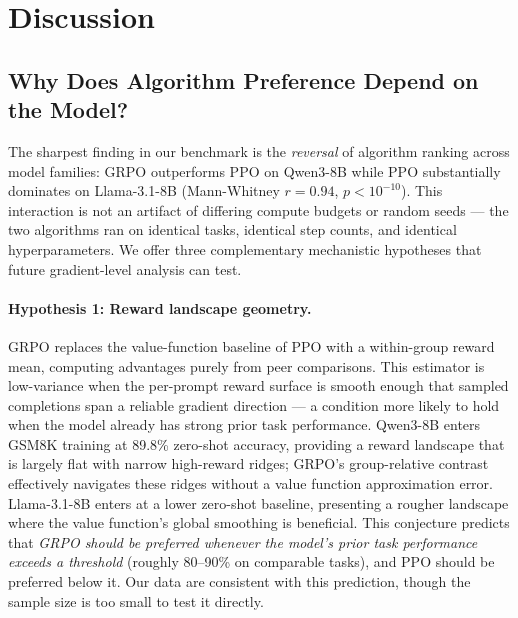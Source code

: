 \documentclass{article}
\begin{document}
\section{Discussion}
\label{sec:discussion}

\subsection{Why Does Algorithm Preference Depend on the Model?}
\label{sec:discuss_model_algo}

The sharpest finding in our benchmark is the \emph{reversal} of algorithm
ranking across model families: GRPO outperforms PPO on Qwen3-8B while PPO
substantially dominates on Llama-3.1-8B (Mann-Whitney $r = 0.94$,
$p < 10^{-10}$).
This interaction is not an artifact of differing compute budgets or random
seeds --- the two algorithms ran on identical tasks, identical step counts, and
identical hyperparameters.
We offer three complementary mechanistic hypotheses that future gradient-level
analysis can test.

\paragraph{Hypothesis 1: Reward landscape geometry.}
GRPO replaces the value-function baseline of PPO with a within-group reward
mean, computing advantages purely from peer comparisons.
This estimator is low-variance when the per-prompt reward surface is smooth
enough that sampled completions span a reliable gradient direction --- a
condition more likely to hold when the model already has strong prior task
performance.
Qwen3-8B enters GSM8K training at 89.8\% zero-shot accuracy, providing a
reward landscape that is largely flat with narrow high-reward ridges; GRPO's
group-relative contrast effectively navigates these ridges without a value
function approximation error.
Llama-3.1-8B enters at a lower zero-shot baseline, presenting a rougher
landscape where the value function's global smoothing is beneficial.
This conjecture predicts that \emph{GRPO should be preferred whenever the
model's prior task performance exceeds a threshold} (roughly 80--90\% on
comparable tasks), and PPO should be preferred below it.
Our data are consistent with this prediction, though the sample size is too
small to test it directly.
\end{document}
